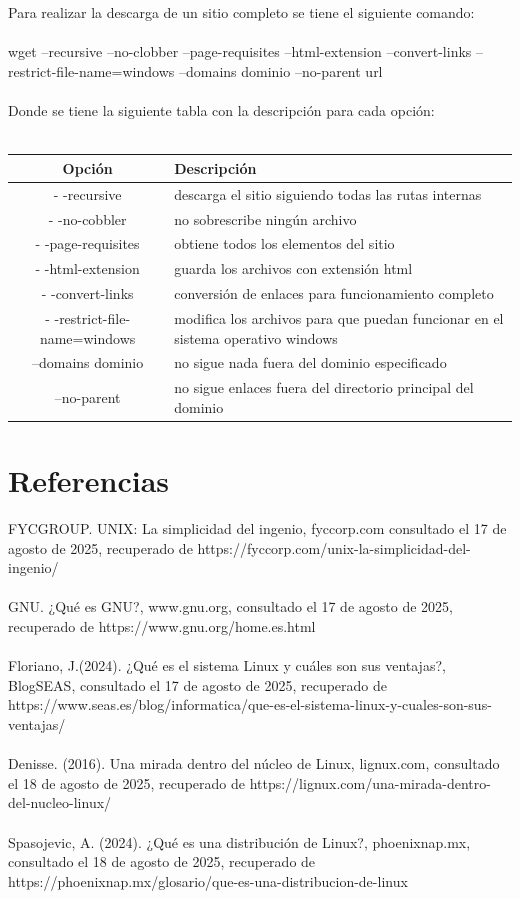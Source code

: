 \documentclass[10pt,a4paper,titlepage]{article}
\begin{document}
	\\
	\\
	Para realizar la descarga de un sitio completo se tiene el siguiente comando:
	\\
	\\
	wget --recursive --no-clobber --page-requisites --html-extension --convert-links --restrict-file-name=windows --domains dominio --no-parent url
	\\
	\\
	Donde se tiene la siguiente tabla con la descripción para cada opción:
	\\
	\\
	\begin{tabular}{|c|p{8cm}|}
		\hline
		Opción & Descripción \\
		\hline
		- -recursive & descarga el sitio siguiendo todas las rutas internas \\
		\hline
		- -no-cobbler & no sobrescribe ningún archivo \\
		\hline 
		- -page-requisites & obtiene todos los elementos del sitio \\
		\hline
		- -html-extension & guarda los archivos con extensión html \\
		\hline
		- -convert-links & conversión de enlaces para funcionamiento completo \\
		\hline
		- -restrict-file-name=windows & modifica los archivos para que puedan funcionar en el sistema operativo windows \\
		\hline
		--domains dominio & no sigue nada fuera del dominio especificado \\
		\hline
		--no-parent & no sigue enlaces fuera del directorio principal del dominio \\
		\hline
	\end{tabular}
	
	\section*{Referencias}
	FYCGROUP. UNIX: La simplicidad del ingenio, fyccorp.com consultado el 17 de agosto de 2025, recuperado de https://fyccorp.com/unix-la-simplicidad-del-ingenio/	
	\\
	\\
	GNU. ¿Qué es GNU?, www.gnu.org, consultado el 17 de agosto de 2025, recuperado de https://www.gnu.org/home.es.html
	\\
	\\
	Floriano, J.(2024). ¿Qué es el sistema Linux y cuáles son sus ventajas?, BlogSEAS, consultado el 17 de agosto de 2025, recuperado de https://www.seas.es/blog/informatica/que-es-el-sistema-linux-y-cuales-son-sus-ventajas/
	\\
	\\
	Denisse. (2016). Una mirada dentro del núcleo de Linux, lignux.com, consultado el 18 de agosto de 2025, recuperado de https://lignux.com/una-mirada-dentro-del-nucleo-linux/
	\\
	\\
	Spasojevic, A. (2024). ¿Qué es una distribución de Linux?, phoenixnap.mx, consultado el 18 de agosto de 2025, recuperado de https://phoenixnap.mx/glosario/que-es-una-distribucion-de-linux
	
\end{document}
